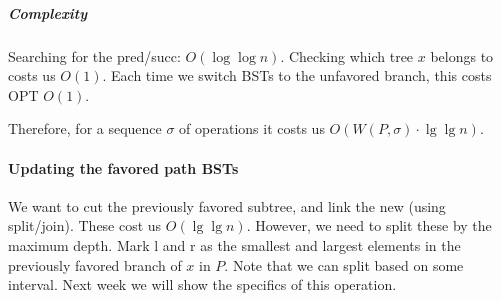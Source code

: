 \documentclass[a4paper]{article}
\begin{document}
\subparagraph{Complexity}
Searching for the pred/succ: $O(\log\log n)$. Checking which tree $x$ belongs to costs us $O(1)$. Each time we switch BSTs to the unfavored branch, this costs OPT $O(1)$.

Therefore, for a sequence $\sigma$ of operations it costs us $O(W(P, \sigma) \cdot \lg\lg n)$.

\paragraph{Updating the favored path BSTs}
We want to cut the previously favored subtree, and link the new (using split/join). These cost us $O(\lg\lg n)$.
However, we need to split these by the maximum depth.
Mark l and r as the smallest and largest elements in the previously favored branch of $x$ in $P$.
Note that we can split based on some interval. Next week we will show the specifics of this operation.
\end{document}
